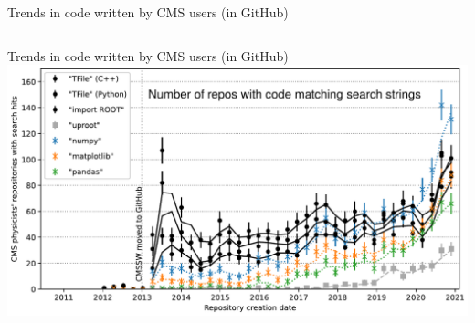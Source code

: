 \documentclass[aspectratio=169]{beamer}
\begin{document}
\begin{frame}{Trends in code written by CMS users (in GitHub)}
\vspace{-0.75 cm}
\begin{columns}
\end{columns}
\end{frame}

\begin{frame}{Trends in code written by CMS users (in GitHub)}
\vspace{0.25 cm}
\includegraphics[width=\linewidth]{PLOTS/lhlhc-github-overlay-lin-paper.pdf}
\end{frame}
\end{document}
